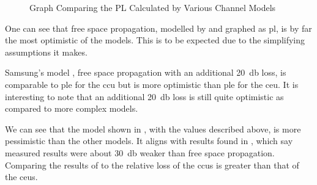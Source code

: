 \begin{figure}[htb]
	\centering
	\caption{Graph Comparing the PL Calculated by Various Channel Models}
	\label{fig:PLcomp}
\end{figure}

\par
One can see that free space propagation, modelled by  and graphed as \ac{pl}, is by far the most optimistic of the models.
This is to be expected due to the simplifying assumptions it makes.

\par
Samsung's model \cite{khan:2011}, free space propagation with an additional \SI{20}{\decibel} loss, is comparable to \ac{ple} for the \ac{ccu} but is more optimistic than \ac{ple} for the \ac{ceu}.
It is interesting to note that an additional \SI{20}{\decibel} loss is still quite optimistic as compared to more complex models.

\par
We can see that the model shown in , with the values described above, is more pessimistic than the other models.
It aligns with results found in \cite{akdeniz:2014}, which say measured results were about \SI{30}{\decibel} weaker than free space propagation.
Comparing the results of  to  the relative loss of the \acp{ccu} is greater than that of the \acp{ceu}.

